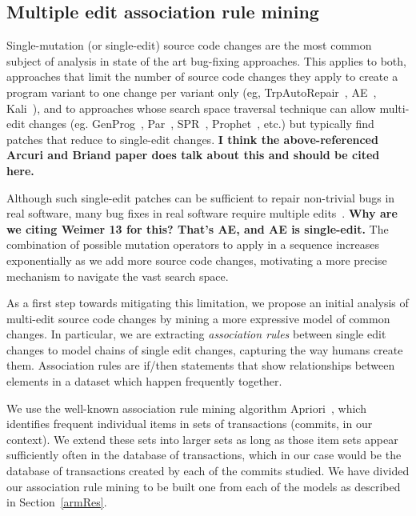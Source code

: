 \documentclass[conference]{IEEEtran}
\newcommand{\todo}[1]
  {{\scriptsize \textbf{\color{red} {#1}}}}
\begin{document}
\subsection{Multiple edit association rule mining} 
\label{multEdit}

Single-mutation (or single-edit) source code changes are the most 
common subject of analysis in 
state of the art bug-fixing
approaches. This applies to both, approaches that limit the number of source 
code changes they apply to create a program variant to one change per variant 
only (eg, TrpAutoRepair~\cite{Qi13}, AE~\cite{Weimer13}, Kali~\cite{Qi15}), and 
to approaches whose search space traversal technique can allow multi-edit 
changes (eg. GenProg~\cite{legoues12}, Par~\cite{kim2013}, SPR~\cite{fan15SPR},
Prophet~\cite{Long2016}, etc.) but typically find patches that reduce to
single-edit changes.\todo{I think the above-referenced Arcuri and Briand paper
  does talk about this and should be cited here.}

Although such single-edit patches can be
sufficient to repair non-trivial bugs in real software, many bug fixes in real
software require multiple edits~\cite{Weimer13}.\todo{Why are we citing Weimer
  13 for this?  That's AE, and AE is single-edit.} The combination of possible mutation
 operators to apply in a sequence increases exponentially as we add more source
 code changes, motivating a more precise mechanism to navigate the vast search
 space. 

As a first step towards mitigating this limitation, we propose 
an initial analysis of multi-edit 
source code changes by mining a more expressive model of common changes. In
particular, we are extracting \emph{association rules} between single edit changes 
to model chains of single edit changes, capturing the way humans create them.
Association rules are if/then statements that show relationships between elements in a dataset which happen frequently together.

We use the 
well-known association rule mining algorithm
Apriori~\cite{Agrawal94,Liu98,Zaki2000}, which identifies frequent 
individual items in sets of transactions (commits, in our context).  We extend these sets into 
larger sets as long as those item sets appear sufficiently often in the database 
of transactions, which in our case would be the database of transactions created 
by each of the commits studied. We have divided our association rule mining to
be built one from each of the models as described in Section~\ref{armRes}. 
\end{document}
